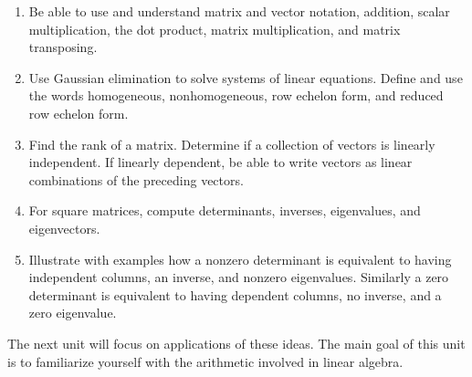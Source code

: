 
\begin{enumerate}

\item Be able to use and understand matrix and vector notation, addition, scalar multiplication, the dot product, matrix multiplication, and matrix transposing. 
\item Use Gaussian elimination to solve systems of linear equations. Define and use the words homogeneous, nonhomogeneous, row echelon form, and reduced row echelon form. 
\item Find the rank of a matrix. Determine if a collection of vectors is linearly independent. If linearly dependent, be able to write vectors as linear combinations of the preceding vectors.
\item For square matrices, compute determinants, inverses, eigenvalues, and eigenvectors. 
\item Illustrate with examples how a nonzero determinant is equivalent to having independent columns, an inverse, and nonzero eigenvalues. Similarly a zero determinant is equivalent to having dependent columns, no inverse, and a zero eigenvalue. 

\end{enumerate}

The next unit will focus on applications of these ideas. The main goal of this unit is to familiarize yourself with the arithmetic involved in linear algebra.
